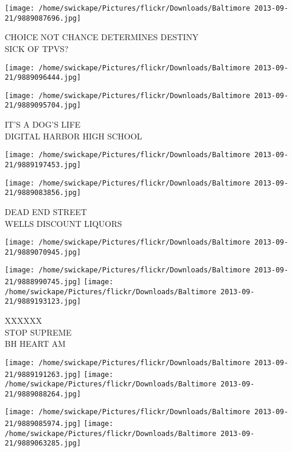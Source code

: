 \documentclass[10pt,letterpaper]{article}
\begin{document}
\vspace{0.25in}
\texttt{[image: /home/swickape/Pictures/flickr/Downloads/Baltimore 2013-09-21/9889087696.jpg]}

CHOICE NOT CHANCE DETERMINES DESTINY\\
SICK OF TPVS?\\
\pagebreak

\texttt{[image: /home/swickape/Pictures/flickr/Downloads/Baltimore 2013-09-21/9889096444.jpg]}

\vspace{0.25in}
\texttt{[image: /home/swickape/Pictures/flickr/Downloads/Baltimore 2013-09-21/9889095704.jpg]}

IT'S A DOG'S LIFE\\
DIGITAL HARBOR HIGH SCHOOL\\
\pagebreak

\texttt{[image: /home/swickape/Pictures/flickr/Downloads/Baltimore 2013-09-21/9889197453.jpg]}

\vspace{0.25in}
\texttt{[image: /home/swickape/Pictures/flickr/Downloads/Baltimore 2013-09-21/9889083856.jpg]}

DEAD END STREET\\
WELLS DISCOUNT LIQUORS\\
\pagebreak

\texttt{[image: /home/swickape/Pictures/flickr/Downloads/Baltimore 2013-09-21/9889070945.jpg]}

\vspace{0.25in}
\texttt{[image: /home/swickape/Pictures/flickr/Downloads/Baltimore 2013-09-21/9888990745.jpg]}
\texttt{[image: /home/swickape/Pictures/flickr/Downloads/Baltimore 2013-09-21/9889193123.jpg]}

XXXXXX\\
STOP SUPREME\\
BH HEART AM\\
\pagebreak

\texttt{[image: /home/swickape/Pictures/flickr/Downloads/Baltimore 2013-09-21/9889191263.jpg]}
\texttt{[image: /home/swickape/Pictures/flickr/Downloads/Baltimore 2013-09-21/9889088264.jpg]}

\texttt{[image: /home/swickape/Pictures/flickr/Downloads/Baltimore 2013-09-21/9889085974.jpg]}
\texttt{[image: /home/swickape/Pictures/flickr/Downloads/Baltimore 2013-09-21/9889063285.jpg]}
\end{document}
